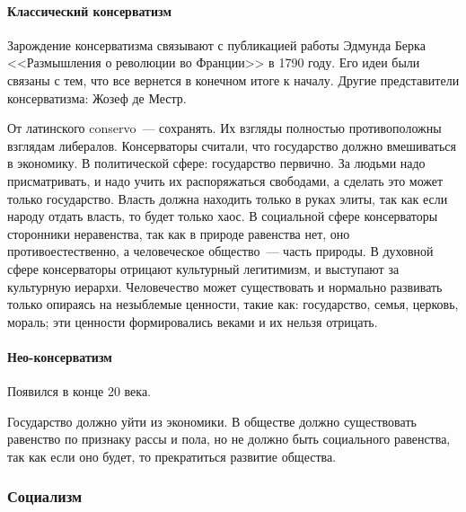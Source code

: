 \documentclass[12pt]{article}
\begin{document}
	\paragraph{Классический консерватизм}
	\begin{note}[Зарождение]
		Зарождение консерватизма связывают с публикацией работы Эдмунда Берка <<Размышления о революции во Франции>> в 1790 году. Его идеи были связаны с тем, что все вернется в конечном итоге к началу. Другие представители консерватизма: Жозеф де Местр.
	\end{note}
	\begin{note}
		От латинского conservo~--- сохранять. Их взгляды полностью противоположны взглядам либералов. Консерваторы считали, что государство должно вмешиваться в экономику. В политической сфере: государство первично. За людьми надо присматривать, и надо учить их распоряжаться свободами, а сделать это может только государство. Власть должна находить только в руках элиты, так как если народу отдать власть, то будет только хаос. В социальной сфере консерваторы сторонники неравенства, так как в природе равенства нет, оно противоестественно, а человеческое общество~--- часть природы. В духовной сфере консерваторы отрицают культурный легитимизм, и выступают за культурную иерархи. Человечество может существовать и нормально развивать только опираясь на незыблемые ценности, такие как: государство, семья, церковь, мораль; эти ценности формировались веками и их нельзя отрицать.
	\end{note}
	\paragraph{Нео-консерватизм}
	\begin{note}[Появление]
		Появился в конце 20 века.
	\end{note}
	\begin{note}[Идеи]
		Государство должно уйти из экономики. В обществе должно существовать равенство по признаку рассы и пола, но не должно быть социального равенства, так как если оно будет, то прекратиться развитие общества.
	\end{note}
	\subsubsection{Социализм}
\end{document}
